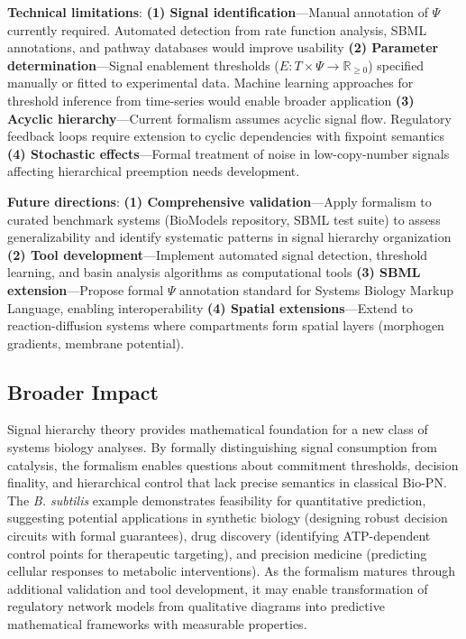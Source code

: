 \vspace{3pt}
\noindent\textbf{Technical limitations}: \textbf{(1) Signal identification}---Manual annotation of $\Psi$ currently required. Automated detection from rate function analysis, SBML annotations, and pathway databases would improve usability \textbf{(2) Parameter determination}---Signal enablement thresholds ($E: T \times \Psi \to \mathbb{R}_{\geq 0}$) specified manually or fitted to experimental data. Machine learning approaches for threshold inference from time-series would enable broader application \textbf{(3) Acyclic hierarchy}---Current formalism assumes acyclic signal flow. Regulatory feedback loops require extension to cyclic dependencies with fixpoint semantics \textbf{(4) Stochastic effects}---Formal treatment of noise in low-copy-number signals affecting hierarchical preemption needs development.

\vspace{3pt}
\noindent\textbf{Future directions}: \textbf{(1) Comprehensive validation}---Apply formalism to curated benchmark systems (BioModels repository, SBML test suite) to assess generalizability and identify systematic patterns in signal hierarchy organization \textbf{(2) Tool development}---Implement automated signal detection, threshold learning, and basin analysis algorithms as computational tools \textbf{(3) SBML extension}---Propose formal $\Psi$ annotation standard for Systems Biology Markup Language, enabling interoperability \textbf{(4) Spatial extensions}---Extend to reaction-diffusion systems where compartments form spatial layers (morphogen gradients, membrane potential).

\subsection{Broader Impact}

\vspace{3pt}
\noindent Signal hierarchy theory provides mathematical foundation for a new class of systems biology analyses. By formally distinguishing signal consumption from catalysis, the formalism enables questions about commitment thresholds, decision finality, and hierarchical control that lack precise semantics in classical Bio-PN. The \textit{B. subtilis} example demonstrates feasibility for quantitative prediction, suggesting potential applications in synthetic biology (designing robust decision circuits with formal guarantees), drug discovery (identifying ATP-dependent control points for therapeutic targeting), and precision medicine (predicting cellular responses to metabolic interventions). As the formalism matures through additional validation and tool development, it may enable transformation of regulatory network models from qualitative diagrams into predictive mathematical frameworks with measurable properties.
